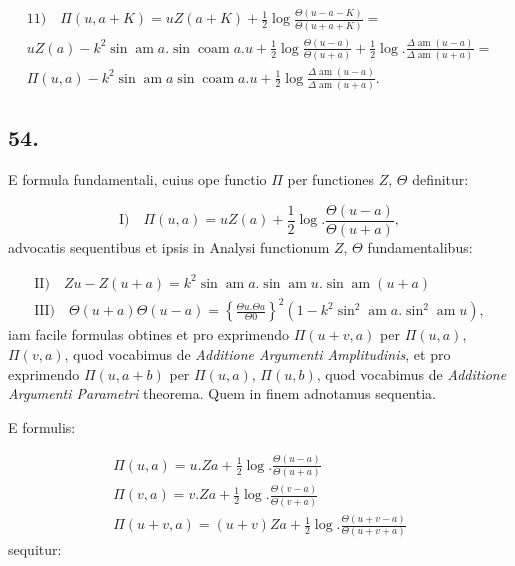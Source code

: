 \documentclass{article}
\begin{document}
\[
\begin{gathered}
\text{11)}\quad \Pi(u,a+K)=uZ(a+K)+\frac{1}{2}\log\frac{\Theta(u-a-K)}{\Theta(u+a+K)}=\\[1.5ex]
uZ(a)-k^{2}\sin\operatorname{am}a.\sin\operatorname{coam}a.u+\frac{1}{2}\log\frac{\Theta(u-a)}{\Theta(u+a)}+\frac{1}{2}\log.\frac{\Delta\operatorname{am}(u-a)}{\Delta\operatorname{am}(u+a)}=\\[1.5ex]
\Pi(u,a)-k^{2}\sin\operatorname{am}a\sin\operatorname{coam}a.u+\frac{1}{2}\log\frac{\Delta\operatorname{am}(u-a)}{\Delta\operatorname{am}(u+a)}.
\end{gathered}
\]

\subsection*{54.}

E formula fundamentali, cuius ope functio $\Pi$ per functiones $Z$, $\Theta$ definitur:

\[
\text{I)}\quad \Pi(u,a)=uZ(a)+\frac{1}{2}\log.\frac{\Theta(u-a)}{\Theta(u+a)},
\]
advocatis sequentibus et ipsis in Analysi functionum $Z$, $\Theta$ fundamentalibus:

\[
\begin{gathered}
\text{II)}\quad Zu-Z(u+a)=k^{2}\sin\operatorname{am}a.\sin\operatorname{am}u.\sin\operatorname{am}(u+a)\\[1.5ex]
\text{III)}\quad \Theta(u+a)\Theta(u-a)=\left\{\frac{\Theta u.\Theta a}{\Theta0}\right\}^{2}\left(1-k^{2}\sin^{2}\operatorname{am}a.\sin^{2}\operatorname{am}u\right),
\end{gathered}
\]
iam facile formulas obtines et pro exprimendo $\Pi(u+v,a)$ per $\Pi(u,a)$, $\Pi(v,a)$, quod vocabimus de \emph{Additione Argumenti Amplitudinis}, et pro exprimendo $\Pi(u,a+b)$ per $\Pi(u,a)$, $\Pi(u,b)$, quod vocabimus de \emph{Additione Argumenti Parametri} theorema. Quem in finem adnotamus sequentia.

E formulis:

\[
\begin{gathered}
\Pi(u,a)=u.Za+\frac{1}{2}\log.\frac{\Theta(u-a)}{\Theta(u+a)}\\[1.5ex]
\Pi(v,a)=v.Za+\frac{1}{2}\log.\frac{\Theta(v-a)}{\Theta(v+a)}\\[1.5ex]
\Pi(u+v,a)=(u+v)Za+\frac{1}{2}\log.\frac{\Theta(u+v-a)}{\Theta(u+v+a)}
\end{gathered}
\]
sequitur:
\end{document}
